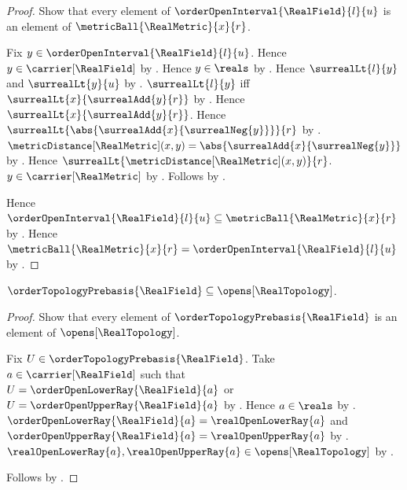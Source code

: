 \begin{proof}
    Show that every element of $\orderOpenInterval{\RealField}{l}{u}$
        is an element of $\metricBall{\RealMetric}{x}{r}$.
    \begin{subproof}
        Fix $y\in\orderOpenInterval{\RealField}{l}{u}$.
        Hence $y\in\carrier[\RealField]$ by
            .
        Hence $y\in\reals$ by .
        Hence $\surrealLt{l}{y}$ and $\surrealLt{y}{u}$ by
            .
        $\surrealLt{l}{y}$ iff
            $\surrealLt{x}{\surrealAdd{y}{r}}$ by
            .
        Hence $\surrealLt{x}{\surrealAdd{y}{r}}$.
        Hence $\surrealLt
            {\abs{\surrealAdd{x}{\surrealNeg{y}}}}{r}$ by
            .
        $\metricDistance[\RealMetric](x,y)
            =\abs{\surrealAdd{x}{\surrealNeg{y}}}$ by
            .
        Hence $\surrealLt{\metricDistance[\RealMetric](x,y)}{r}$.
        $y\in\carrier[\RealMetric]$ by
            .
        Follows by .
    \end{subproof}
    Hence $\orderOpenInterval{\RealField}{l}{u}\subseteq
        \metricBall{\RealMetric}{x}{r}$ by .
    Hence $\metricBall{\RealMetric}{x}{r}
        =\orderOpenInterval{\RealField}{l}{u}$ by
        .
\end{proof}

\begin{theorem}\label{real_order_topology_prebasis_is_metric_open}
    $\orderTopologyPrebasis{\RealField}\subseteq\opens[\RealTopology]$.
\end{theorem}
\begin{proof}
    Show that every element of $\orderTopologyPrebasis{\RealField}$ is
        an element of $\opens[\RealTopology]$.
    \begin{subproof}
        Fix $U\in\orderTopologyPrebasis{\RealField}$.
        Take $a\in\carrier[\RealField]$ such that
            $U=\orderOpenLowerRay{\RealField}{a}$ or
            $U=\orderOpenUpperRay{\RealField}{a}$ by
            .
        Hence $a\in\reals$ by .
        $\orderOpenLowerRay{\RealField}{a}=\realOpenLowerRay{a}$ and
            $\orderOpenUpperRay{\RealField}{a}=\realOpenUpperRay{a}$ by
            .
        $\realOpenLowerRay{a},\realOpenUpperRay{a}
            \in\opens[\RealTopology]$ by
            .
    \end{subproof}
    Follows by .
\end{proof}

